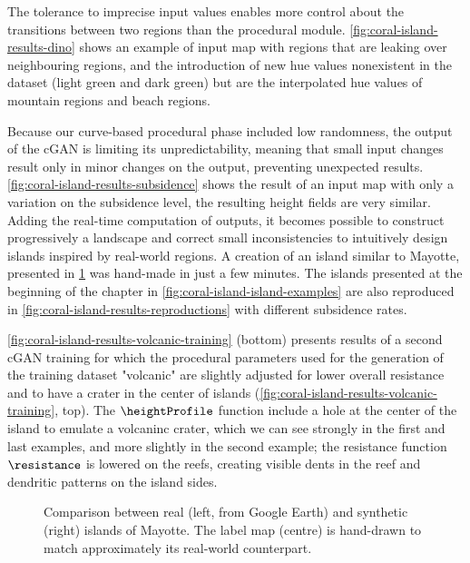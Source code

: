 The tolerance to imprecise input values enables more control about the transitions between two regions than the procedural module. \cref{fig:coral-island-results-dino} shows an example of input map with regions that are leaking over neighbouring regions, and the introduction of new hue values nonexistent in the dataset (light green and dark green) but are the interpolated hue values of mountain regions and beach regions.

Because our curve-based procedural phase included low randomness, the output of the cGAN is limiting its unpredictability, meaning that small input changes result only in minor changes on the output, preventing unexpected results. \cref{fig:coral-island-results-subsidence} shows the result of an input map with only a variation on the subsidence level, the resulting height fields are very similar. Adding the real-time computation of outputs, it becomes possible to construct progressively a landscape and correct small inconsistencies to intuitively design islands inspired by real-world regions. A creation of an island similar to Mayotte, presented in \cref{fig:coral-island-example-Mayotte} was hand-made in just a few minutes. The islands presented at the beginning of the chapter in \cref{fig:coral-island-island-examples} are also reproduced in \cref{fig:coral-island-results-reproductions} with different subsidence rates.

\cref{fig:coral-island-results-volcanic-training} (bottom) presents results of a second cGAN training for which the procedural parameters used for the generation of the training dataset "volcanic" are slightly adjusted for lower overall resistance and to have a crater in the center of islands (\cref{fig:coral-island-results-volcanic-training}, top). The $\heightProfile$ function include a hole at the center of the island to emulate a volcaninc crater, which we can see strongly in the first and last examples, and more slightly in the second example; the resistance function $\resistance$ is lowered on the reefs, creating visible dents in the reef and dendritic patterns on the island sides.

\begin{figure}
    \caption[Comparison of  the cGAN output with Mayotte Island]{Comparison between real (left, from Google Earth) and synthetic (right) islands of Mayotte. The label map (centre) is hand-drawn to match approximately its real-world counterpart.}
    \label{fig:coral-island-example-Mayotte}
\end{figure}




